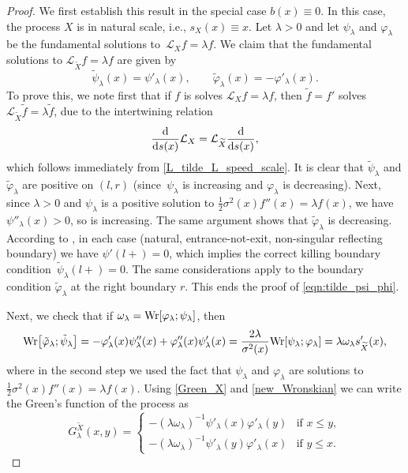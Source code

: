 \documentclass[10pt,a4paper]{amsart}
\numberwithin{equation}{section}
\theoremstyle{definition}
\def\L{{\mathcal L}}
\def\wr{{\textnormal{Wr}}}
\def\d{{\textnormal d}}
\begin{document}
\begin{proof}
We first establish this result in the special case $b(x) \equiv 0$. In this case, the process $X$ is in natural scale, i.e., $s_X(x) \equiv x$. Let $\lambda>0$ and let $\psi_{\lambda}$ and $\varphi_{\lambda}$ be the fundamental solutions to~${\L_X f=\lambda f}$. We claim that the fundamental solutions to $\L_{\widetilde X} f= \lambda f$ are given by
\begin{equation}\label{eqn:tilde_psi_phi}
\tilde \psi_{\lambda}(x)=\psi'_{\lambda}(x), \qquad
\tilde \varphi_{\lambda}(x)=-\varphi'_{\lambda}(x).
\end{equation}
To prove this, we note first that if $f$ is solves $\L_X f=\lambda f$, then $\tilde f=f'$ solves $\L_{\widetilde X} \tilde f=\lambda \tilde f$, due to the intertwining relation
\[
\frac{\d}{\d s(x)} \L_X = \L_{\widetilde X}  \frac{\d}{\d s(x)},
\]
which follows immediately from \eqref{L_tilde_L_speed_scale}.
 It is clear that $\tilde \psi_{\lambda}$ and $\tilde \varphi_{\lambda}$ are positive on $(l,r)$ (since~$\psi_{\lambda}$ is increasing
and $\varphi_{\lambda}$ is decreasing). Next, since $\lambda>0$ and $\psi_{\lambda}$ is a positive solution to $\tfrac{1}{2} \sigma^2(x) f''(x)=\lambda f(x)$, we have $\psi''_{\lambda}(x)>0$, so  is increasing. The same argument shows that $\tilde \varphi_{\lambda}$ is decreasing. According to
\cite[Section II.10]{Borodin2002}, in each case (natural, entrance-not-exit, non-singular reflecting boundary) we have
$\psi'(l+)=0$, which implies the correct killing boundary condition~${\tilde \psi_{\lambda}(l+)=0}$. The same considerations apply to the boundary condition $\tilde \varphi_{\lambda}$ at the right boundary $r$. This ends the proof of \eqref{eqn:tilde_psi_phi}.



Next, we check that if $\omega_{\lambda}=\wr[\varphi_{\lambda}; \psi_{\lambda}]$, then
\begin{equation}\label{new_Wronskian}
\wr\big[\tilde \varphi_{\lambda}; \tilde \psi_{\lambda}\big]=
-\varphi'_{\lambda}(x) \psi''_{\lambda}(x)+\varphi''_{\lambda}(x)\psi'_{\lambda}(x)
=\frac{2\lambda}{\sigma^2(x)} \wr[\psi_{\lambda}; \varphi_{\lambda}]=\lambda \omega_{\lambda} s_{\widetilde X}'(x),
\end{equation}
where in the second step we used the fact that $\psi_{\lambda}$ and $\varphi_{\lambda}$ are solutions to $\tfrac{1}{2} \sigma^2(x) f''(x)=\lambda f(x)$.
Using \eqref{Green_X} and \eqref{new_Wronskian} we can write the Green's function of the process  as
\begin{equation}\label{Green_tilde_X}
 G^{\widetilde X}_{\lambda}(x,y)=
 \begin{cases}
 -(\lambda \omega_{\lambda})^{-1} \psi'_{\lambda}(x) \varphi'_{\lambda}(y)  & {\text{if }} x\le y, \\
 -(\lambda \omega_{\lambda})^{-1} \psi'_{\lambda}(y) \varphi'_{\lambda}(x)  & {\text{if }} y\le x.
 \end{cases}
\end{equation}


\end{proof}
\end{document}
